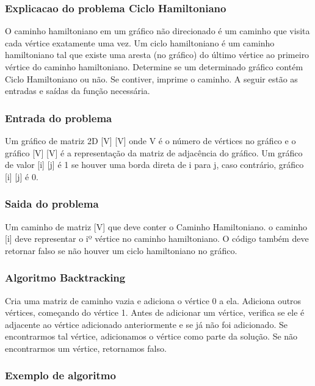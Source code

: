 \subsubsection*{Explicacao do problema Ciclo Hamiltoniano}

O caminho hamiltoniano em um gráfico não direcionado é um caminho que visita cada vértice exatamente uma vez. 
Um ciclo hamiltoniano é um caminho hamiltoniano tal que existe uma aresta (no gráfico) do último vértice ao primeiro vértice do caminho hamiltoniano. 
Determine se um determinado gráfico contém Ciclo Hamiltoniano ou não. Se contiver, imprime o caminho. A seguir estão as entradas e saídas da função necessária.

\subsubsection*{Entrada do problema}

Um gráfico de matriz 2D [V] [V] onde V é o número de vértices no gráfico e o gráfico [V] [V] é a representação da matriz de adjacência do gráfico. 
Um gráfico de valor [i] [j] é 1 se houver uma borda direta de i para j, caso contrário, gráfico [i] [j] é 0.

\subsubsection*{Saida do problema}

Um caminho de matriz [V] que deve conter o Caminho Hamiltoniano. o caminho [i] deve representar o iº vértice no caminho hamiltoniano. 
O código também deve retornar falso se não houver um ciclo hamiltoniano no gráfico.

\subsubsection*{Algoritmo Backtracking}  

Cria uma matriz de caminho vazia e adiciona o vértice 0 a ela. 
Adiciona outros vértices, começando do vértice 1. 
Antes de adicionar um vértice, verifica se ele é adjacente ao vértice adicionado anteriormente e se já não foi adicionado. 
Se encontrarmos tal vértice, adicionamos o vértice como parte da solução. 
Se não encontrarmos um vértice, retornamos falso.

\subsubsection*{Exemplo de algoritmo}

